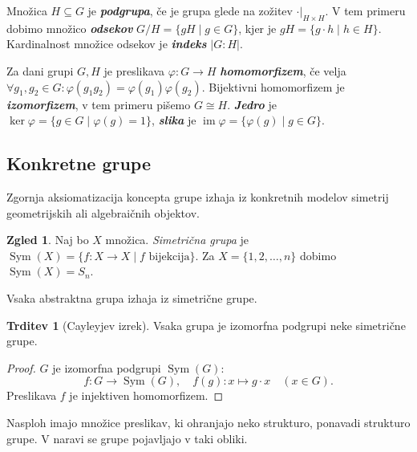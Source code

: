 \documentclass[11pt]{book}
\DeclareMathOperator\image{im}
\DeclareMathOperator\Sym{Sym}
\def\definicija{\color{rdeca}\bf\em}
\theoremstyle{definition}
\theoremstyle{zgled}
\newtheorem*{zgled}{Zgled}
\theoremstyle{odprtproblem}
\theoremstyle{domacanaloga}
\newenvironment{dokaz}
    {\color{siva}\begin{proof}}
    {\end{proof}}
\theoremstyle{izrek}
\newtheorem*{trditev}{Trditev}
\begin{document}
Množica $H \subseteq G$ je {\definicija podgrupa}, če je grupa glede na zožitev $\cdot |_{H \times H}$. V tem primeru dobimo množico {\definicija odsekov} $G/H = \{ gH \mid g \in G \}$, kjer je $gH = \{ g \cdot h \mid h \in H \}$. Kardinalnost množice odsekov je {\definicija indeks} $|G:H|$.

Za dani grupi $G,H$ je preslikava $\varphi \colon G \to H$ {\definicija homomorfizem}, če velja $\forall g_1, g_2 \in G \colon \varphi(g_1 g_2) = \varphi(g_1) \varphi(g_2)$. Bijektivni homomorfizem je {\definicija izomorfizem}, v tem primeru pišemo $G \cong H$. {\definicija Jedro} je $\ker \varphi = \{ g \in G \mid \varphi(g) = 1 \}$, {\definicija slika} je $\image \varphi = \{ \varphi(g) \mid g \in G \}$.

\subsection{Konkretne grupe}

Zgornja aksiomatizacija koncepta grupe izhaja iz konkretnih modelov simetrij geometrijskih ali algebraičnih objektov.

\begin{zgled}
Naj bo $X$ množica. {\em Simetrična grupa} je $\Sym(X) = \{ f \colon X \to X \mid f \text{ bijekcija} \}$. Za $X = \{ 1,2,\dots, n\}$ dobimo $\Sym(X) = S_n$.
\end{zgled}

Vsaka abstraktna grupa izhaja iz simetrične grupe.

\begin{trditev}[Cayleyjev izrek]
Vsaka grupa je izomorfna podgrupi neke simetrične grupe.
\end{trditev}

\begin{dokaz}
$G$ je izomorfna podgrupi $\Sym(G)$:
\[
f \colon G \to \Sym(G), \quad f(g) \colon x \mapsto g \cdot x \quad (x \in G).
\]
Preslikava $f$ je injektiven homomorfizem.
\end{dokaz}

Nasploh imajo množice preslikav, ki ohranjajo neko strukturo, ponavadi strukturo grupe. V naravi se grupe pojavljajo v taki obliki.
\end{document}
